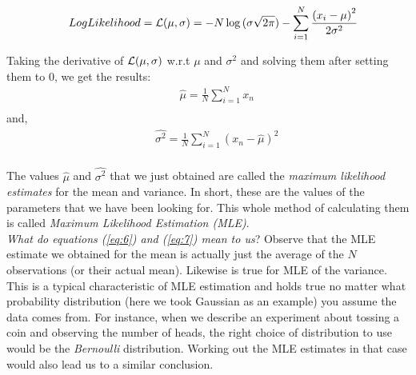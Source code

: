 \documentclass[a4paper]{article}
\begin{document}
\begin{equation} \label{eq:5}
\begin{aligned}
& & Log Likelihood = {\cal L}(\mu, \sigma) = - N \log{(\sigma \sqrt{2 \pi})} - \sum_{i=1}^{N}  \frac{ {(x_i-\mu)}^2} {2 \sigma^2} \\
\end{aligned}
\end{equation}

\noindent Taking the derivative of ${\cal L}(\mu, \sigma)$ w.r.t $\mu$ and $\sigma^2$ and solving them after setting them to 0, we get the results:
\begin{equation} \label{eq:6}
\begin{aligned}
& & \widehat{\mu} = \frac{1}{N} \sum_{i=1}^{N} x_n\\
\end{aligned}
\end{equation}
and,
\begin{equation} \label{eq:7}
\begin{aligned}
& & \widehat{\sigma^2} = \frac{1}{N} \sum_{i=1}^{N} (x_n - \widehat{\mu})^2\\
\end{aligned}
\end{equation}

\noindent The values $\widehat{\mu}$ and $\widehat{\sigma^2}$ that we just obtained are called the \textit{maximum likelihood estimates} for the mean and variance. In short, these are the values of the parameters that we have been looking for. This whole method of calculating them is called \textit{Maximum Likelihood Estimation (MLE)}.\\

\noindent \textit{What do equations (\ref{eq:6}) and (\ref{eq:7}) mean to us}?
Observe that the MLE estimate we obtained for the mean is actually just the average of the $N$ observations (or their actual mean). Likewise is true for MLE of the variance. This is a typical characteristic of MLE estimation and holds true no matter what probability distribution (here we took Gaussian as an example) you assume the data comes from. For instance, when we describe an experiment about tossing a coin and observing the number of heads, the right choice of distribution to use would be the \textit{Bernoulli} distribution. Working out the MLE estimates in that case would also lead us to a similar conclusion. \\
\end{document}
